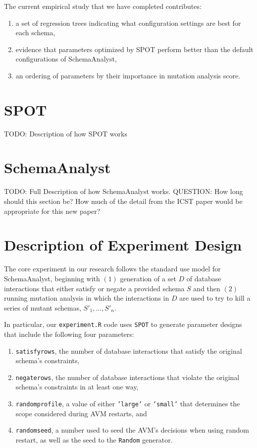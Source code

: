 \documentclass[a4paper,twocolumn]{article}
\begin{document}
The current empirical study that we have completed contributes:

\begin{enumerate}
\item a set of regression trees indicating what configuration settings are best for each schema,
\item evidence that parameters optimized by SPOT perform better than the default configurations of SchemaAnalyst,
\item an ordering of parameters by their importance in mutation analysis score.
\end{enumerate}

\section{SPOT} \label{sec:SPOT}

TODO: Description of how SPOT works

\section{SchemaAnalyst} \label{sec:schemaanalyst}

TODO: Full Description of how SchemaAnalyst works. QUESTION: How long should this section be? How much of the detail from the ICST paper would be appropriate for this new paper? 

\section{Description of Experiment Design} \label{sec:exp-des}

The core experiment in our research follows the standard use model for SchemaAnalyst, beginning with $(1)$ generation of a set $D$ of database interactions that either satisfy or negate a provided schema $S$ and then $(2)$ running mutation analysis in which the interactions in $D$ are used to try to kill a series of mutant schemas, $S'_1, \dots, S'_n$.

In particular, our \texttt{experiment.R} code uses \texttt{SPOT} to generate parameter designs that include the following four parameters:
\begin{enumerate}
\item \texttt{satisfyrows}, the number of database interactions that satisfy the original schema's constraints,
\item \texttt{negaterows}, the number of database interactions that violate the original schema's constraints in at least one way,
\item \texttt{randomprofile}, a value of either \texttt{'large'} or \texttt{'small'} that determines the scope considered during AVM restarts, and
\item \texttt{randomseed}, a number used to seed the AVM's decisions when using random restart, as well as the seed to the \texttt{Random} generator.
\end{enumerate}
\end{document}
